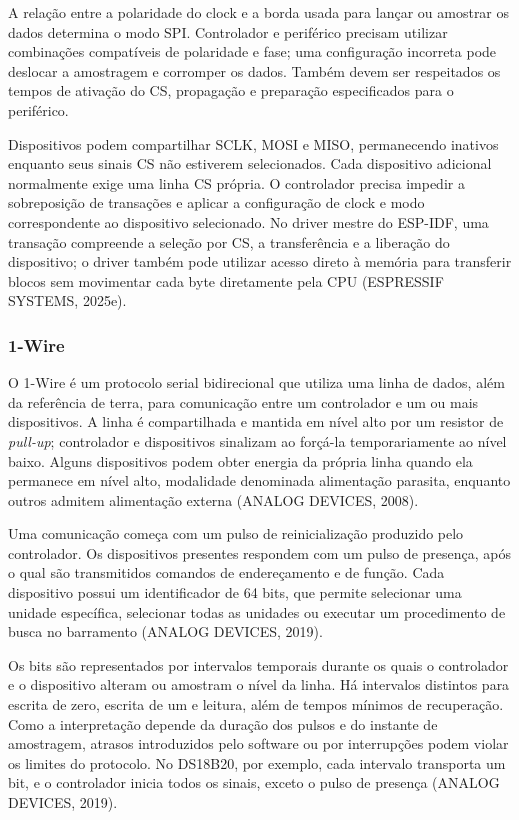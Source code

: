 \documentclass{article}
\begin{document}
A rela\c{c}\~ao entre a polaridade do clock e a borda usada para lan\c{c}ar ou amostrar os dados determina o modo SPI. Controlador e perif\'erico precisam utilizar combina\c{c}\~oes compat\'iveis de polaridade e fase; uma configura\c{c}\~ao incorreta pode deslocar a amostragem e corromper os dados. Tamb\'em devem ser respeitados os tempos de ativa\c{c}\~ao do CS, propaga\c{c}\~ao e prepara\c{c}\~ao especificados para o perif\'erico.


Dispositivos podem compartilhar SCLK, MOSI e MISO, permanecendo inativos enquanto seus sinais CS n\~ao estiverem selecionados. Cada dispositivo adicional normalmente exige uma linha CS pr\'opria. O controlador precisa impedir a sobreposi\c{c}\~ao de transa\c{c}\~oes e aplicar a configura\c{c}\~ao de clock e modo correspondente ao dispositivo selecionado. No driver mestre do ESP-IDF, uma transa\c{c}\~ao compreende a sele\c{c}\~ao por CS, a transfer\^encia e a libera\c{c}\~ao do dispositivo; o driver tamb\'em pode utilizar acesso direto \`a mem\'oria para transferir blocos sem movimentar cada byte diretamente pela CPU (ESPRESSIF SYSTEMS, 2025e).


\subsubsection{1-Wire}


O 1-Wire \'e um protocolo serial bidirecional que utiliza uma linha de dados, al\'em da refer\^encia de terra, para comunica\c{c}\~ao entre um controlador e um ou mais dispositivos. A linha \'e compartilhada e mantida em n\'ivel alto por um resistor de \emph{pull-up}; controlador e dispositivos sinalizam ao for\c{c}\'a-la temporariamente ao n\'ivel baixo. Alguns dispositivos podem obter energia da pr\'opria linha quando ela permanece em n\'ivel alto, modalidade denominada alimenta\c{c}\~ao parasita, enquanto outros admitem alimenta\c{c}\~ao externa (ANALOG DEVICES, 2008).


Uma comunica\c{c}\~ao come\c{c}a com um pulso de reinicializa\c{c}\~ao produzido pelo controlador. Os dispositivos presentes respondem com um pulso de presen\c{c}a, ap\'os o qual s\~ao transmitidos comandos de endere\c{c}amento e de fun\c{c}\~ao. Cada dispositivo possui um identificador de 64 bits, que permite selecionar uma unidade espec\'ifica, selecionar todas as unidades ou executar um procedimento de busca no barramento (ANALOG DEVICES, 2019).


Os bits s\~ao representados por intervalos temporais durante os quais o controlador e o dispositivo alteram ou amostram o n\'ivel da linha. H\'a intervalos distintos para escrita de zero, escrita de um e leitura, al\'em de tempos m\'inimos de recupera\c{c}\~ao. Como a interpreta\c{c}\~ao depende da dura\c{c}\~ao dos pulsos e do instante de amostragem, atrasos introduzidos pelo software ou por interrup\c{c}\~oes podem violar os limites do protocolo. No DS18B20, por exemplo, cada intervalo transporta um bit, e o controlador inicia todos os sinais, exceto o pulso de presen\c{c}a (ANALOG DEVICES, 2019).
\end{document}
